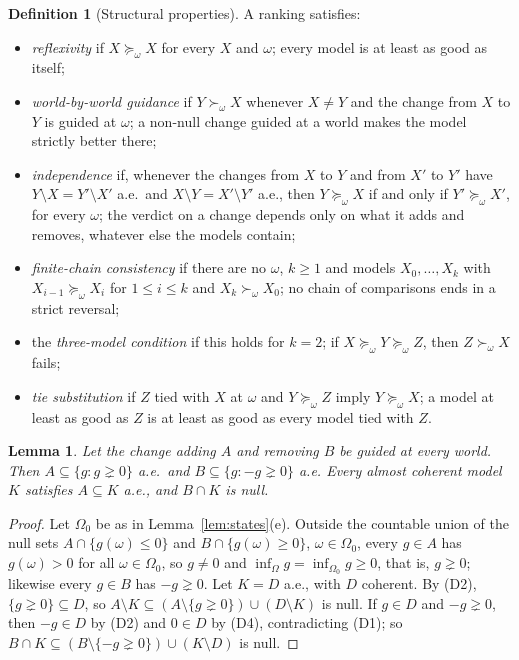 \documentclass[11pt]{article}
\newtheorem{lemma}[theorem]{Lemma}
\theoremstyle{definition}
\newtheorem{definition}[theorem]{Definition}
\begin{document}
\begin{definition}[Structural properties]\label{def:properties}
A ranking satisfies:
\begin{itemize}[leftmargin=*]
\item \emph{reflexivity} if $X\succeq_\omega X$ for every $X$ and $\omega$; every model is at least as good as itself;
\item \emph{world-by-world guidance} if $Y\succ_\omega X$ whenever $X\ne Y$ and the change from $X$ to $Y$ is guided at $\omega$; a non-null change guided at a world makes the model strictly better there;
\item \emph{independence} if, whenever the changes from $X$ to $Y$ and from $X'$ to $Y'$ have $Y\setminus X=Y'\setminus X'$ a.e.\ and $X\setminus Y=X'\setminus Y'$ a.e., then $Y\succeq_\omega X$ if and only if $Y'\succeq_\omega X'$, for every $\omega$; the verdict on a change depends only on what it adds and removes, whatever else the models contain;
\item \emph{finite-chain consistency} if there are no $\omega$, $k\ge1$ and models $X_0,\dots,X_k$ with $X_{i-1}\succeq_\omega X_i$ for $1\le i\le k$ and $X_k\succ_\omega X_0$; no chain of comparisons ends in a strict reversal;
\item the \emph{three-model condition} if this holds for $k=2$; if $X\succeq_\omega Y\succeq_\omega Z$, then $Z\succ_\omega X$ fails;
\item \emph{tie substitution} if $Z$ tied with $X$ at $\omega$ and $Y\succeq_\omega Z$ imply $Y\succeq_\omega X$; a model at least as good as $Z$ is at least as good as every model tied with $Z$.
\end{itemize}
\end{definition}

\begin{lemma}\label{lem:guided}
Let the change adding $A$ and removing $B$ be guided at every world. Then $A\subseteq\{g:g\gneq0\}$ a.e.\ and $B\subseteq\{g:-g\gneq0\}$ a.e. Every almost coherent model $K$ satisfies $A\subseteq K$ a.e., and $B\cap K$ is null.
\end{lemma}
\begin{proof}
Let $\Omega_0$ be as in Lemma~\ref{lem:states}(e). Outside the countable union of the null sets $A\cap\{g(\omega)\le0\}$ and $B\cap\{g(\omega)\ge0\}$, $\omega\in\Omega_0$, every $g\in A$ has $g(\omega)>0$ for all $\omega\in\Omega_0$, so $g\ne0$ and $\inf_\Omega g=\inf_{\Omega_0}g\ge0$, that is, $g\gneq0$; likewise every $g\in B$ has $-g\gneq0$. Let $K=D$ a.e., with $D$ coherent. By (D2), $\{g\gneq0\}\subseteq D$, so $A\setminus K\subseteq(A\setminus\{g\gneq0\})\cup(D\setminus K)$ is null. If $g\in D$ and $-g\gneq0$, then $-g\in D$ by (D2) and $0\in D$ by (D4), contradicting (D1); so $B\cap K\subseteq(B\setminus\{-g\gneq0\})\cup(K\setminus D)$ is null.
\end{proof}
\end{document}
